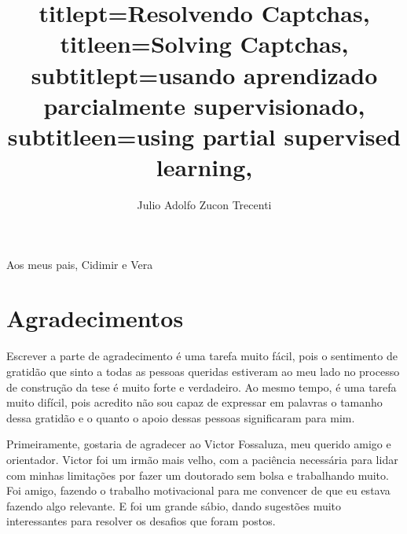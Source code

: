 \documentclass[12pt,twoside,brazilian]{book}
\title{
    titlept={Resolvendo Captchas},
    titleen={Solving Captchas},
    subtitlept={usando aprendizado parcialmente supervisionado},
    subtitleen={using partial supervised learning},
}
\author{Julio Adolfo Zucon Trecenti}
\begin{document}

\frontmatter

\pagestyle{plain}

\onehalfspacing %

\maketitle %


\begin{dedicatoria}
Aos meus pais,
Cidimir e Vera
\end{dedicatoria}


\chapter*{Agradecimentos}

Escrever a parte de agradecimento é uma tarefa muito fácil, pois o sentimento de gratidão que sinto a todas as pessoas queridas estiveram ao meu lado no processo de construção da tese é muito forte e verdadeiro. Ao mesmo tempo, é uma tarefa muito difícil, pois acredito não sou capaz de expressar em palavras o tamanho dessa gratidão e o quanto o apoio dessas pessoas significaram para mim.

Primeiramente, gostaria de agradecer ao Victor Fossaluza, meu querido amigo e orientador. Victor foi um irmão mais velho, com a paciência necessária para lidar com minhas limitações por fazer um doutorado sem bolsa e trabalhando muito. Foi amigo, fazendo o trabalho motivacional para me convencer de que eu estava fazendo algo relevante. E foi um grande sábio, dando sugestões muito interessantes para resolver os desafios que foram postos.
\end{document}
